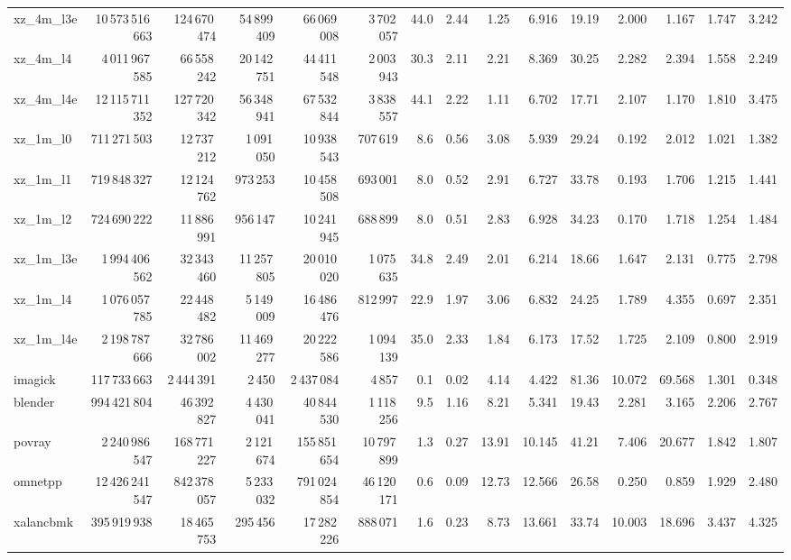 \documentclass[9pt,landscape,a4paper]{article}
\begin{document}
\begin{adjustbox}{max width=\textwidth, max totalheight=0.50\textheight}
\begin{tabular}{lrrrrrrrrrrrrrr}
xz\_4m\_l3e & 10\,573\,516\,663 & 124\,670\,474 & 54\,899\,409 & 66\,069\,008 & 3\,702\,057 & 44.0 & 2.44 & 1.25 & 6.916 & 19.19 & 2.000 & 1.167 & 1.747 & 3.242 \\
xz\_4m\_l4 & 4\,011\,967\,585 & 66\,558\,242 & 20\,142\,751 & 44\,411\,548 & 2\,003\,943 & 30.3 & 2.11 & 2.21 & 8.369 & 30.25 & 2.282 & 2.394 & 1.558 & 2.249 \\
xz\_4m\_l4e & 12\,115\,711\,352 & 127\,720\,342 & 56\,348\,941 & 67\,532\,844 & 3\,838\,557 & 44.1 & 2.22 & 1.11 & 6.702 & 17.71 & 2.107 & 1.170 & 1.810 & 3.475 \\
xz\_1m\_l0 & 711\,271\,503 & 12\,737\,212 & 1\,091\,050 & 10\,938\,543 & 707\,619 & 8.6 & 0.56 & 3.08 & 5.939 & 29.24 & 0.192 & 2.012 & 1.021 & 1.382 \\
xz\_1m\_l1 & 719\,848\,327 & 12\,124\,762 & 973\,253 & 10\,458\,508 & 693\,001 & 8.0 & 0.52 & 2.91 & 6.727 & 33.78 & 0.193 & 1.706 & 1.215 & 1.441 \\
xz\_1m\_l2 & 724\,690\,222 & 11\,886\,991 & 956\,147 & 10\,241\,945 & 688\,899 & 8.0 & 0.51 & 2.83 & 6.928 & 34.23 & 0.170 & 1.718 & 1.254 & 1.484 \\
xz\_1m\_l3e & 1\,994\,406\,562 & 32\,343\,460 & 11\,257\,805 & 20\,010\,020 & 1\,075\,635 & 34.8 & 2.49 & 2.01 & 6.214 & 18.66 & 1.647 & 2.131 & 0.775 & 2.798 \\
xz\_1m\_l4 & 1\,076\,057\,785 & 22\,448\,482 & 5\,149\,009 & 16\,486\,476 & 812\,997 & 22.9 & 1.97 & 3.06 & 6.832 & 24.25 & 1.789 & 4.355 & 0.697 & 2.351 \\
xz\_1m\_l4e & 2\,198\,787\,666 & 32\,786\,002 & 11\,469\,277 & 20\,222\,586 & 1\,094\,139 & 35.0 & 2.33 & 1.84 & 6.173 & 17.52 & 1.725 & 2.109 & 0.800 & 2.919 \\
imagick & 117\,733\,663 & 2\,444\,391 & 2\,450 & 2\,437\,084 & 4\,857 & 0.1 & 0.02 & 4.14 & 4.422 & 81.36 & 10.072 & 69.568 & 1.301 & 0.348 \\
blender & 994\,421\,804 & 46\,392\,827 & 4\,430\,041 & 40\,844\,530 & 1\,118\,256 & 9.5 & 1.16 & 8.21 & 5.341 & 19.43 & 2.281 & 3.165 & 2.206 & 2.767 \\
povray & 2\,240\,986\,547 & 168\,771\,227 & 2\,121\,674 & 155\,851\,654 & 10\,797\,899 & 1.3 & 0.27 & 13.91 & 10.145 & 41.21 & 7.406 & 20.677 & 1.842 & 1.807 \\
omnetpp & 12\,426\,241\,547 & 842\,378\,057 & 5\,233\,032 & 791\,024\,854 & 46\,120\,171 & 0.6 & 0.09 & 12.73 & 12.566 & 26.58 & 0.250 & 0.859 & 1.929 & 2.480 \\
xalancbmk & 395\,919\,938 & 18\,465\,753 & 295\,456 & 17\,282\,226 & 888\,071 & 1.6 & 0.23 & 8.73 & 13.661 & 33.74 & 10.003 & 18.696 & 3.437 & 4.325 \\

\end{tabular}
\end{adjustbox}
\end{document}
